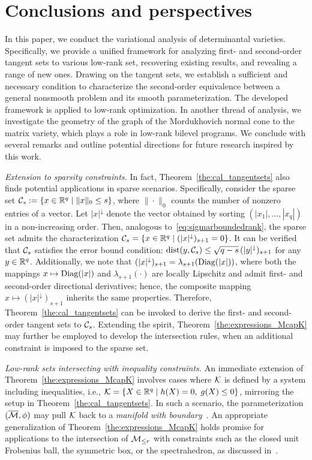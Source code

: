 \section{Conclusions and perspectives}\label{sec:conclusion}
In this paper, we conduct the variational analysis of determinantal varieties. Specifically, we provide a unified framework for analyzing first- and second-order tangent sets to various low-rank set, recovering existing results, and revealing a range of new ones. Drawing on the tangent sets, we establish a sufficient and necessary condition to characterize the second-order equivalence between a general nonsmooth problem and its smooth parameterization. The developed framework is applied to low-rank optimization. In another thread of analysis, we investigate the geometry of the graph of the Mordukhovich normal cone to the matrix variety, which plays a role in low-rank bilevel programs. We conclude with several remarks and outline potential directions for future research inspired by this work.

\emph{Extension to sparsity constraints.} 
In fact, Theorem~\ref{the:cal_tangentsets} also finds potential applications in sparse scenarios.  Specifically, consider the sparse set $\mathcal{C}_s := \{x\in\mathbb{R}^q \mid \|x\|_0 \le s\}$, where $\|\cdot\|_0$ counts the number of nonzero entries of a vector. 
Let $|x|^\downarrow$ denote the vector obtained by sorting $(|x_1|,\dots,|x_q|)$ in a non-increasing order. Then, analogous to~\eqref{eq:sigmarboundedrank}, the sparse set admits the characterization $\mathcal{C}_s=\{x\in\mathbb{R}^q \mid (|x|^\downarrow)_{s+1}=0\}$. It can be verified that $\mathcal{C}_s$ satisfies the error bound condition: $\operatorname{dist}(y,\mathcal{C}_s)\le \sqrt{q-s}\,(|y|^\downarrow)_{s+1}$ for any $y\in\mathbb{R}^q$. Additionally, we note that $(|x|^\downarrow)_{s+1}=\lambda_{s+1}(\operatorname{Diag}(|x|))$, where both the mappings $x\mapsto \operatorname{Diag}(|x|)$ and $\lambda_{s+1}(\cdot)$ are locally Lipschitz and admit first- and second-order directional derivatives; hence, the composite mapping $x\mapsto (|x|^\downarrow)_{s+1}$ inherits the same properties. Therefore, Theorem~\ref{the:cal_tangentsets} can be invoked to derive the first- and second-order tangent sets to $\mathcal{C}_s$. Extending the spirit, Theorem~\ref{the:expressions_McapK} may further be employed to develop the intersection rules, when an additional constraint is imposed to the sparse set.

{\emph{Low-rank sets intersecting with inequality constraints.}} An immediate extension of Theorem~\ref{the:expressions_McapK} involves cases where $\mathcal{K}$ is defined by a system including inequalities, i.e., $\mathcal{K}=\{X\in\mathbb{R}^q \mid h(X)=0,\; g(X)\le 0\}$, mirroring the setup in Theorem~\ref{the:cal_tangentsets}. In such a scenario, the parameterization $(\overline{\mathcal{M}},\phi)$ may pull $\mathcal{K}$ back to a \emph{manifold with boundary}~\cite{lee2012manifolds}. An appropriate generalization of Theorem~\ref{the:expressions_McapK} holds promise for applications to the intersection of $\mathcal{M}_{\le r}$ with constraints such as the closed unit Frobenius ball, the symmetric box, or the spectrahedron, as discussed in~\cite{li2020jotaspectral}.




